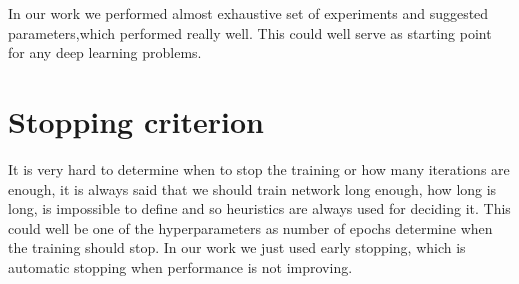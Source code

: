 In our work we performed almost exhaustive set of experiments and suggested parameters,which performed really well. This could well serve as starting point for any deep learning problems.

\section{Stopping criterion}
It is very hard to determine when to stop the training or how many iterations are enough, it is always said that we should train network long enough, how long is long, is impossible to define and so heuristics are always used for deciding it.
This could well be one of the hyperparameters as number of epochs determine when the training should stop. In our work we just used early stopping, which is automatic stopping when performance is not improving.
 


